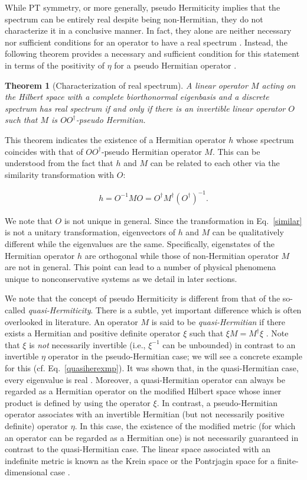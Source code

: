 \documentclass{tADP2e}
\theoremstyle{plain}
\newcommand{\eqn}[1]{
\begin{eqnarray}
	#1
\end{eqnarray}
}
\theoremstyle{plain}
\newtheorem{theorem}{Theorem}[section]
\theoremstyle{definition}
\begin{document}
While PT symmetry, or more generally, pseudo Hermiticity implies that the spectrum can be entirely real despite being non-Hermitian, they do not characterize it in a conclusive manner. In fact, they alone are neither necessary nor sufficient conditions for an operator to have a real spectrum \cite{AM02}.  Instead, the following theorem provides a necessary and sufficient condition for this statement in terms of the positivity of  $\eta$ for a pseudo Hermitian operator \cite{AM022}.
\begin{theorem}[Characterization of real spectrum]
\label{realspectrum} A linear operator $M$ acting on the Hilbert space with a complete biorthonormal eigenbasis and a discrete spectrum has real spectrum if and only if there is an invertible linear operator $O$ such that $M$ is $OO^\dagger$-pseudo Hermitian. 
\end{theorem}
This theorem indicates the existence of a Hermitian operator $h$ whose spectrum coincides with that of $OO^\dagger$-pseudo Hermitian operator $M$. This can be understood from the fact that $h$ and $M$ can be related to each other via the similarity transformation with $O$:
\eqn{\label{similar}
h=O^{-1}MO=O^{\dagger}M^{\dagger}{(O^\dagger)^{-1}}.
}
We note that $O$ is not unique in general. Since the transformation in Eq.~\eqref{similar} is not a unitary transformation, eigenvectors of $h$ and $M$ can be qualitatively different while the eigenvalues are the same. Specifically, eigenstates of the Hermitian operator $h$ are orthogonal while those of non-Hermitian operator $M$ are not in general.  This point can lead to a number of physical phenomena unique to nonconservative systems as we detail in later sections.


We note that the concept of pseudo Hermiticity is different from that of the so-called \emph{quasi-Hermiticity}. There is a subtle, yet important difference which is often overlooked in literature. An operator $M$ is said to be {\it quasi-Hermitian} if there exists a Hermitian and positive definite operator $\xi$ such that  $\xi M=M^\dagger \xi$ \cite{WJP69}. Note that $\xi$ is \emph{not} necessarily invertible (i.e., $\xi^{-1}$ can be unbounded) in contrast to an invertible $\eta$ operator in the pseudo-Hermitian case; we will see a concrete example for this (cf. Eq.~\eqref{quasiherexmp}). It was shown that, in the quasi-Hermitian case, every eigenvalue is real \cite{WJP69,FGS92}. Moreover, a quasi-Hermitian operator can always be regarded as a Hermitian operator on the modified Hilbert space whose inner product is defined by using the operator $\xi$. In contrast, a pseudo-Hermitian operator associates with an invertible Hermitian (but not necessarily positive definite) operator $\eta$. In this case, the existence of the modified metric (for which an operator can be regarded as a Hermitian one) is not necessarily guaranteed in  contrast to the quasi-Hermitian case. The linear space associated with an indefinite metric is known as the Krein space or the Pontrjagin space for a finite-dimensional case \cite{TYA89}.
\end{document}
